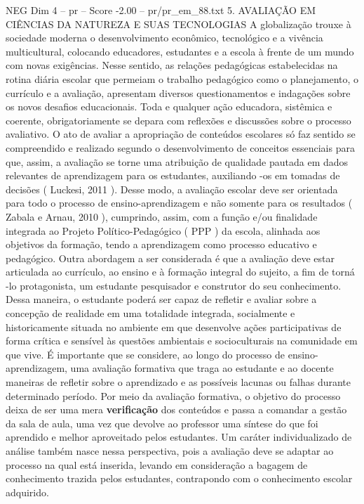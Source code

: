 \begin{textsample}{NEG Dim 4 – pr – Score -2.00 – pr/pr\_em\_88.txt}  \label{ex:f4_neg_108}
5.
AVALIAÇÃO EM CIÊNCIAS DA NATUREZA E SUAS TECNOLOGIAS A globalização trouxe à sociedade moderna o desenvolvimento econômico, tecnológico e a vivência multicultural, colocando educadores, estudantes e a escola à frente de um mundo com novas exigências.
Nesse sentido, as relações pedagógicas estabelecidas na rotina diária escolar que permeiam o trabalho pedagógico como o planejamento, o currículo e a avaliação, apresentam diversos questionamentos e indagações sobre os novos desafios educacionais.
Toda e qualquer ação educadora, sistêmica e coerente, obrigatoriamente se depara com reflexões e discussões sobre o processo avaliativo.
O ato de avaliar a apropriação de conteúdos escolares só faz sentido se compreendido e realizado segundo o desenvolvimento de conceitos essenciais para que, assim, a avaliação se torne uma atribuição de qualidade pautada em dados relevantes de aprendizagem para os estudantes, auxiliando -os em tomadas de decisões ( Luckesi, 2011 ).
Desse modo, a avaliação escolar deve ser orientada para todo o processo de ensino-aprendizagem e não somente para os resultados ( Zabala e Arnau, 2010 ), cumprindo, assim, com a função e/ou finalidade integrada ao Projeto Político-Pedagógico ( PPP ) da escola, alinhada aos objetivos da formação, tendo a aprendizagem como processo educativo e pedagógico.
Outra abordagem a ser considerada é que a avaliação deve estar articulada ao currículo, ao ensino e à formação integral do sujeito, a fim de torná -lo protagonista, um estudante pesquisador e construtor do seu conhecimento.
Dessa maneira, o estudante poderá ser capaz de refletir e avaliar sobre a concepção de realidade em uma totalidade integrada, socialmente e historicamente situada no ambiente em que desenvolve ações participativas de forma crítica e sensível às questões ambientais e socioculturais na comunidade em que vive.
É importante que se considere, ao longo do processo de ensino-aprendizagem, uma avaliação formativa que traga ao estudante e ao docente maneiras de refletir sobre o aprendizado e as possíveis lacunas ou falhas durante determinado período.
Por meio da avaliação formativa, o objetivo do processo deixa de ser uma mera \textbf{verificação} dos conteúdos e passa a comandar a gestão da sala de aula, uma vez que devolve ao professor uma síntese do que foi aprendido e melhor aproveitado pelos estudantes.
Um caráter individualizado de análise também nasce nessa perspectiva, pois a avaliação deve se adaptar ao processo na qual está inserida, levando em consideração a bagagem de conhecimento trazida pelos estudantes, contrapondo com o conhecimento escolar adquirido.

\end{textsample}
